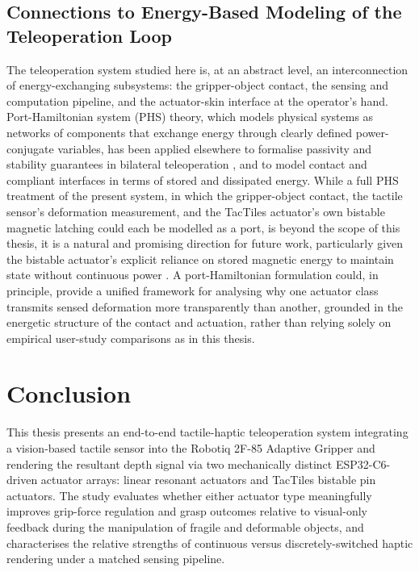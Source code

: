 \documentclass[12pt, a4paper]{report}
\begin{document}
\section{Connections to Energy-Based Modeling of the Teleoperation Loop}
The teleoperation system studied here is, at an abstract level, an interconnection of energy-exchanging subsystems: the gripper-object contact, the sensing and computation pipeline, and the actuator-skin interface at the operator's hand. Port-Hamiltonian system (PHS) theory, which models physical systems as networks of components that exchange energy through clearly defined power-conjugate variables, has been applied elsewhere to formalise passivity and stability guarantees in bilateral teleoperation \cite{secchi2007}, and to model contact and compliant interfaces in terms of stored and dissipated energy. While a full PHS treatment of the present system, in which the gripper-object contact, the tactile sensor's deformation measurement, and the TacTiles actuator's own bistable magnetic latching could each be modelled as a port, is beyond the scope of this thesis, it is a natural and promising direction for future work, particularly given the bistable actuator's explicit reliance on stored magnetic energy to maintain state without continuous power \cite{vechev2019}. A port-Hamiltonian formulation could, in principle, provide a unified framework for analysing why one actuator class transmits sensed deformation more transparently than another, grounded in the energetic structure of the contact and actuation, rather than relying solely on empirical user-study comparisons as in this thesis.

\chapter{Conclusion}
\label{ch:conclusion}
This thesis presents an end-to-end tactile-haptic teleoperation system integrating a vision-based tactile sensor into the Robotiq 2F-85 Adaptive Gripper and rendering the resultant depth signal via two mechanically distinct ESP32-C6-driven actuator arrays: linear resonant actuators and TacTiles bistable pin actuators. The study evaluates whether either actuator type meaningfully improves grip-force regulation and grasp outcomes relative to visual-only feedback during the manipulation of fragile and deformable objects, and characterises the relative strengths of continuous versus discretely-switched haptic rendering under a matched sensing pipeline.
\end{document}

